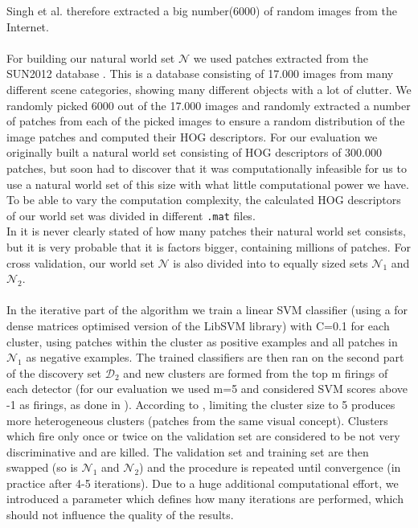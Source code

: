 Singh et al. therefore extracted a big number(6000) of random images from the Internet.\\
\\
For building our natural world set $\mathcal{N}$ we used patches extracted from the SUN2012 database \cite{SUN2010}.
This is a database consisting of 17.000 images from many different scene categories, showing many different objects with a lot of clutter.
We randomly picked 6000 out of the 17.000 images and randomly extracted a number of patches from each of the picked images to
ensure a random distribution of the image patches and computed their HOG descriptors. For our evaluation we originally
built a natural world set consisting of HOG descriptors of 300.000 patches, but soon had to discover that it was computationally infeasible for us
to use a natural world set of this size with what little computational power we have. To be able to vary the computation complexity, the calculated HOG descriptors of our world set was divided in different {\tt .mat} files.\\
In \cite{Singh2012DiscPat} it is never clearly stated of how 
many patches their natural world set consists, but it is very probable that it is factors bigger, containing millions of patches.
For cross validation, our world set $\mathcal{N}$ is also divided into to equally sized sets $\mathcal{N}_1$ and $\mathcal{N}_2$.\\
\\
In the iterative part of the algorithm we train a linear SVM classifier (using a for dense matrices optimised version of the LibSVM library) with C=0.1 for each cluster, using patches within
the cluster as positive examples and all patches in $\mathcal{N}_1$ as negative examples. The trained classifiers are then ran on the second part 
of the discovery set $\mathcal{D}_2$ and new clusters are formed from the top m firings of each detector (for our evaluation we used
m=5 and considered SVM scores above -1 as firings, as done in \cite{Singh2012DiscPat}). According to \cite{Singh2012DiscPat},
limiting the cluster size to 5 produces more heterogeneous clusters (patches from the same visual concept). Clusters which fire
only once or twice on the validation set are considered to be not very discriminative and are killed. The validation set and training
set are then swapped (so is $\mathcal{N}_1$ and $\mathcal{N}_2$) and the procedure is repeated until convergence (in practice after 4-5 iterations). Due to a huge additional computational effort, we introduced a parameter which defines how many iterations are performed, which should not influence the quality of the results.\\

